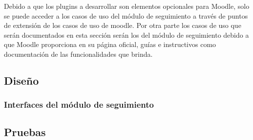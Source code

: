  \noindent
 Debido a que los plugins a desarrollar son elementos opcionales para Moodle, solo se puede
 acceder a los casos de uso del módulo de seguimiento a través de puntos de extensión de los
 casos de uso de moodle. Por otra parte los casos de uso que serán documentados en esta sección
 serán los del módulo de seguimiento debido a que Moodle proporciona en su página oficial, guías
 e instructivos como documentación de las funcionalidades que brinda.



   
   
   
   

\clearpage
\subsection{Diseño}

\subsubsection{Interfaces del módulo de seguimiento}

    
    
    
    
    




\subsection{Pruebas}
